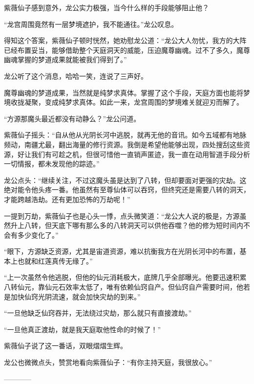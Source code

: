 \begin{this_body}
紫薇仙子感到意外，龙公实力极强，当今什么样的手段能够阻止他？

“龙宫周围竟然有一层梦境遮护，我不能通往。”龙公叹息。

得知这个答案，紫薇仙子顿时恍然，她劝慰龙公道：“龙公大人勿忧，我方的大阵已经布置妥当，能够借助整个天庭洞天的威能，压迫魔尊幽魂。过不了多久，魔尊幽魂掌握的梦道成果就能被我们得到了。”

龙公听了这个消息，哈哈一笑，连说了三声好。

魔尊幽魂的梦道成果，当然就是纯梦求真体。掌握了这个手段，天庭方面也能将梦境收拢凝聚，变成纯梦求真体。如此一来，龙宫周围的梦境难关就迎刃而解了。

“方源那魔头最近都没有动静么？”龙公问道。

紫薇仙子摇头：“自从他从光阴长河中逃脱，就再无他的音讯。如今五域都有地脉频动，南疆尤最，翻出海量的修行资源。我倒是希望他能够出现，四处搜刮这些资源，好让我们有可趁之机，但很可惜他一直销声匿迹，我一直在动用智道手段分析一切情报，都未发现他的踪迹。”

龙公点头：“继续关注，不过这魔头虽是达到了八转，但却要面对更强的灾劫。这绝对能令他头疼一番。他虽然有至尊仙体可以吞窍，但终究还是需要八转的洞天，才能跨越浩劫。还有更加恐怖的万劫呢！”

一提到万劫，紫薇仙子也是心头一悸，点头微笑道：“龙公大人说的极是，方源虽然升上八转，但天底下哪有那么多的八转洞天可以供他吞噬？他的修为短时间内不会有多少变化了。”

“眼下，方源缺乏资源，尤其是宙道资源，难以抗衡我方在光阴长河中的布置，基本上也就和红莲真传无缘了。”

“上一次虽然令他逃脱，但他的仙元消耗极大，底牌几乎全部曝光。他要迅速积累八转仙元，靠仙元石效率太低了，唯有依赖仙窍自产。但仙窍自产需要时间，他若是加快仙窍光阴流速，就会加快灾劫的到来。”

“一旦他缺乏仙窍吞并，无法绕过灾劫，那么就只有直接渡劫。”

“一旦他真正渡劫，就是我天庭取他性命的时候了！”

紫薇仙子说了这一番话，双眼熠熠生辉。

龙公也微微点头，赞赏地看向紫薇仙子：“有你主持天庭，我很放心。”

------------

\end{this_body}

